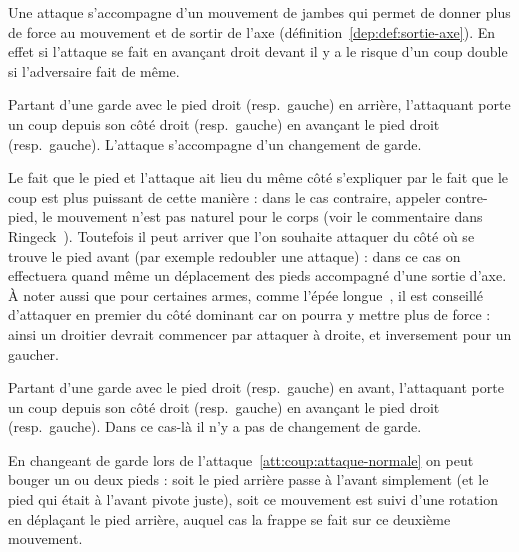 
Une attaque s'accompagne d'un mouvement de jambes qui permet de donner plus de force au mouvement et de sortir de l'axe (définition~\ref{dep:def:sortie-axe}).
En effet si l'attaque se fait en avançant droit devant il y a le risque d'un coup double si l'adversaire fait de même.


\begin{coup}
	\label{att:coup:attaque-normale}

	Partant d'une garde avec le pied droit (resp.\ gauche) en arrière, l'attaquant porte un coup depuis son côté droit (resp.\ gauche) en avançant le pied droit (resp.\ gauche).
	L'attaque s'accompagne d'un changement de garde.
\end{coup}

Le fait que le pied et l'attaque ait lieu du même côté s'expliquer par le fait que le coup est plus puissant de cette manière : dans le cas contraire, appeler contre-pied, le mouvement n'est pas naturel pour le corps (voir le commentaire dans Ringeck~\cite[p.~7]{Ringeck:Farrell:2014:CodexRingeck}).
Toutefois il peut arriver que l'on souhaite attaquer du côté où se trouve le pied avant (par exemple redoubler une attaque) : dans ce cas on effectuera quand même un déplacement des pieds accompagné d'une sortie d'axe.
À noter aussi que pour certaines armes, comme l'épée longue~\cite[p.~10]{Ringeck:Farrell:2014:CodexRingeck}, il est conseillé d'attaquer en premier du côté dominant car on pourra y mettre plus de force : ainsi un droitier devrait commencer par attaquer à droite, et inversement pour un gaucher.


\begin{coup}
	\label{att:coup:attaque-même-côté}

	Partant d'une garde avec le pied droit (resp.\ gauche) en avant, l'attaquant porte un coup depuis son côté droit (resp.\ gauche) en avançant le pied droit (resp.\ gauche).
	Dans ce cas-là il n'y a pas de changement de garde.
\end{coup}


En changeant de garde lors de l'attaque~\ref{att:coup:attaque-normale} on peut bouger un ou deux pieds : soit le pied arrière passe à l'avant simplement (et le pied qui était à l'avant pivote juste), soit ce mouvement est suivi d'une rotation en déplaçant le pied arrière, auquel cas la frappe se fait sur ce deuxième mouvement.

